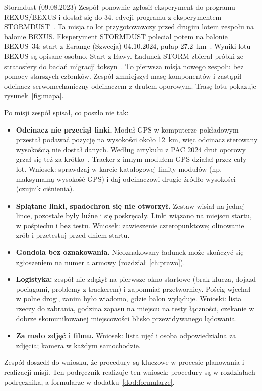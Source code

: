 \clearpage
\begin{sekcja}{Stormdust (09.08.2023)}
Zespół ponownie zgłosił eksperyment do programu REXUS/BEXUS i dostał się do 34. edycji programu z eksperymentem STORMDUST~\cite{bexus34}. Ta misja to lot przygotowawczy przed drugim lotem zespołu na balonie BEXUS. Eksperyment STORMDUST poleciał potem na balonie BEXUS~34: start z Esrange (Szwecja) 04.10.2024, pułap \SI{27.2}{km}~\cite{esabx34}. Wyniki lotu BEXUS są opisane osobno. Start z Iławy. Ładunek STORM zbierał próbki ze stratosfery do badań migracji toksyn~\cite{storm}. To pierwsza misja nowego zespołu bez pomocy starszych członków. Zespół zmniejszył masę komponentów i zastąpił odcinacz serwomechaniczny odcinaczem z drutem oporowym. Trasę lotu pokazuje rysunek~\ref{fig:mapa}.

Po misji zespół spisał, co poszło nie tak:
\begin{itemize}
  \item \textbf{Odcinacz nie przeciął linki.} Moduł GPS w komputerze pokładowym przestał podawać pozycję na wysokości około \SI{12}{km}, więc odcinacz sterowany wysokością nie dostał danych. Według artykułu z PAC 2024 drut oporowy grzał się też za krótko~\cite{pac2024}. Tracker z innym modułem GPS działał przez cały lot. Wniosek: sprawdzaj w karcie katalogowej limity modułów (np. maksymalną wysokość GPS) i daj odcinaczowi drugie źródło wysokości (czujnik ciśnienia).
  \item \textbf{Splątane linki, spadochron się nie otworzył.} Zestaw wisiał na jednej lince, pozostałe były luźne i się poskręcały. Linki wiązano na miejscu startu, w pośpiechu i bez testu. Wniosek: zawieszenie czteropunktowe; olinowanie zrób i przetestuj przed dniem startu.
  \item \textbf{Gondola bez oznakowania.} Nieoznakowany ładunek może skończyć się zgłoszeniem na numer alarmowy (rozdział~\ref{ch:prawo}).
  \item \textbf{Logistyka:} zespół nie zdążył na pierwsze okno startowe (brak klucza, dojazd pociągami, problemy z trackerem) i zapomniał przetwornicy. Pościg wjechał w polne drogi, zanim było wiadomo, gdzie balon wyląduje. Wnioski: lista rzeczy do zabrania, godzina zapasu na miejscu na testy łączności, czekanie w dobrze skomunikowanej miejscowości blisko przewidywanego lądowania.
  \item \textbf{Za mało zdjęć i filmu.} Wniosek: lista ujęć i osoba odpowiedzialna za zdjęcia; kamera w każdym samochodzie.
\end{itemize}
Zespół doszedł do wniosku, że procedury są kluczowe w procesie planowania i realizacji misji. Ten podręcznik realizuje ten wniosek: procedury są w rozdziałach podręcznika, a formularze w dodatku~\ref{dod:formularze}.

\end{sekcja}

